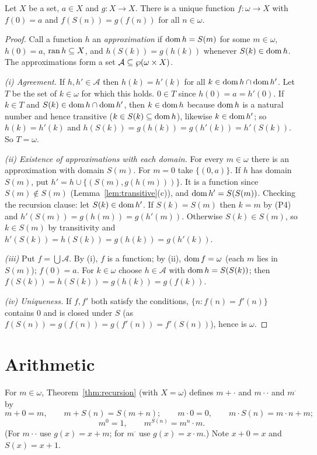 \begin{theorem}[Recursion]\label{thm:recursion}
	Let $X$ be a set, $a\in X$ and $g:X\to X$. There is a unique function $f:\omega\to X$ with $f(0)=a$ and $f(S(n))=g(f(n))$ for all $n\in\omega$.
\end{theorem}
\begin{proof}
	Call a function $h$ an \emph{approximation} if $\operatorname{dom} h=S(m)$ for some $m\in\omega$, $h(0)=a$, $\operatorname{ran} h\subseteq X$, and $h(S(k))=g(h(k))$ whenever $S(k)\in\operatorname{dom} h$. The approximations form a set $\mathcal A\subseteq\wp(\omega\times X)$.
	
	\emph{(i) Agreement.} If $h,h'\in\mathcal A$ then $h(k)=h'(k)$ for all $k\in\operatorname{dom} h\cap\operatorname{dom} h'$. Let $T$ be the set of $k\in\omega$ for which this holds. $0\in T$ since $h(0)=a=h'(0)$. If $k\in T$ and $S(k)\in\operatorname{dom} h\cap\operatorname{dom} h'$, then $k\in\operatorname{dom} h$ because $\operatorname{dom} h$ is a natural number and hence transitive ($k\in S(k)\subseteq\operatorname{dom} h$), likewise $k\in\operatorname{dom} h'$; so $h(k)=h'(k)$ and $h(S(k))=g(h(k))=g(h'(k))=h'(S(k))$. So $T=\omega$.
	
	\emph{(ii) Existence of approximations with each domain.} For every $m\in\omega$ there is an approximation with domain $S(m)$. For $m=0$ take $\{(0,a)\}$. If $h$ has domain $S(m)$, put $h'=h\cup\{(S(m),g(h(m)))\}$. It is a function since $S(m)\notin S(m)$ (Lemma~\ref{lem:transitive}(c)), and $\operatorname{dom} h'=S(S(m))$. Checking the recursion clause: let $S(k)\in\operatorname{dom} h'$. If $S(k)=S(m)$ then $k=m$ by (P4) and $h'(S(m))=g(h(m))=g(h'(m))$. Otherwise $S(k)\in S(m)$, so $k\in S(m)$ by transitivity and $h'(S(k))=h(S(k))=g(h(k))=g(h'(k))$.
	
	\emph{(iii)} Put $f=\bigcup\mathcal A$. By (i), $f$ is a function; by (ii), $\operatorname{dom} f=\omega$ (each $m$ lies in $S(m)$); $f(0)=a$. For $k\in\omega$ choose $h\in\mathcal A$ with $\operatorname{dom} h=S(S(k))$; then $f(S(k))=h(S(k))=g(h(k))=g(f(k))$.
	
	\emph{(iv) Uniqueness.} If $f,f'$ both satisfy the conditions, $\{n:f(n)=f'(n)\}$ contains $0$ and is closed under $S$ (as $f(S(n))=g(f(n))=g(f'(n))=f'(S(n))$), hence is $\omega$.
\end{proof}

\section{Arithmetic}

\begin{definition}
	For $m\in\omega$, Theorem~\ref{thm:recursion} (with $X=\omega$) defines $m+\cdot$ and $m\cdot\cdot$ and $m^\cdot$ by
	\[
	m+0=m,\qquad m+S(n)=S(m+n);\qquad m\cdot0=0,\qquad m\cdot S(n)=m\cdot n+m;
	\]
	\[
	m^0=1,\qquad m^{S(n)}=m^n\cdot m.
	\]
	(For $m\cdot\cdot$ use $g(x)=x+m$; for $m^\cdot$ use $g(x)=x\cdot m$.) Note $x+0=x$ and $S(x)=x+1$.
\end{definition}

